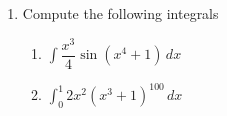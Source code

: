 \documentclass[12pt]{article}
\begin{document}
    \begin{enumerate}
        \item Compute the following integrals

            \begin{enumerate}
                \item $\displaystyle\int \dfrac{x^3}{4}\sin(x^4+1)\, dx$
                \vspace{3in}

                \item $\displaystyle\int_0^1 2x^2(x^3+1)^{100}\, dx$
            \end{enumerate}
    \end{enumerate}
\end{document}
